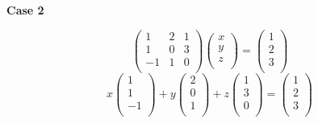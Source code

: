 \documentclass[UTF8]{book}
\begin{document}
    \noindent \textbf{Case 2}

    \begin{equation}
        \begin{pmatrix}
            1 & 2 & 1 \\
            1 & 0 & 3 \\
            -1 & 1 & 0 \\
        \end{pmatrix}
        \begin{pmatrix}
            x \\
            y \\
            z \\
        \end{pmatrix}
        =
        \begin{pmatrix}
            1 \\
            2 \\
            3 \\
        \end{pmatrix}
        \end{equation}
        \begin{equation}
            x
            \begin{pmatrix}
                1 \\
                1 \\
                -1 \\
            \end{pmatrix}
            +
            y
            \begin{pmatrix}
                2 \\
                0 \\
                1 \\
            \end{pmatrix}
            +
            z
            \begin{pmatrix}
                1 \\
                3 \\
                0 \\
            \end{pmatrix}
            =
            \begin{pmatrix}
                1 \\
                2 \\
                3 \\
            \end{pmatrix}
        \end{equation}
\end{document}
